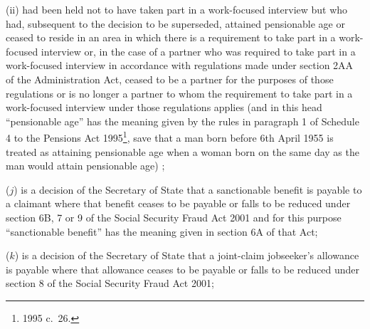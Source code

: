 \documentclass[12pt,a4paper]{article}
\begin{document}
\begin{enumerate}
\begin{enumerate}
(ii) had been held not to have taken part in a work-focused interview but who had, subsequent to the decision to be superseded, attained 
pensionable age  %
or ceased to reside in an area in which there is a requirement to take part in a work-focused interview
or, in the case of a partner who was required to take part in a work-focused interview 
in accordance with regulations made under section 2AA of the Administration Act, ceased to be a partner for the purposes of those regulations or is no longer a partner to whom the requirement to take part in a work-focused interview under those regulations applies  %
(and in this head “pensionable age” has the meaning given by the rules in paragraph 1 of Schedule 4 to the Pensions Act 1995\footnote{1995 c.~26.}, save that a man born before 6th April 1955 is treated as attaining pensionable age when a woman born on the same day as the man would attain pensionable age)%
;
\end{enumerate}


($j$) is a decision of the Secretary of State that a sanctionable benefit is payable to a claimant where that benefit ceases to be payable or falls to be reduced under section 
6B,  %
7 or 9 of the Social Security Fraud Act 2001 and for this purpose “sanctionable benefit” has the 
meaning given in section 6A  %
of that Act;

($k$) is a decision of the Secretary of State that a joint-claim jobseeker’s allowance is payable where that allowance ceases to be payable or falls to be reduced under section 8 of the Social Security Fraud Act 2001;


\end{enumerate}
\end{document}
